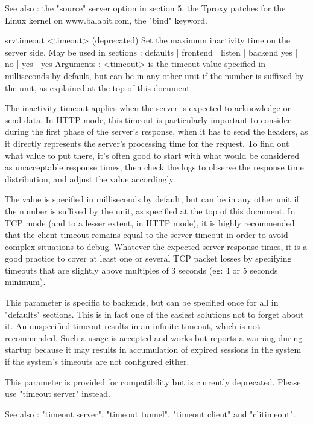   See also : the "source" server option in section 5, the Tproxy patches for
             the Linux kernel on www.balabit.com, the "bind" keyword.


srvtimeout <timeout> (deprecated)
  Set the maximum inactivity time on the server side.
  May be used in sections :   defaults | frontend | listen | backend
                                 yes   |    no    |   yes  |   yes
  Arguments :
    <timeout> is the timeout value specified in milliseconds by default, but
              can be in any other unit if the number is suffixed by the unit,
              as explained at the top of this document.

  The inactivity timeout applies when the server is expected to acknowledge or
  send data. In HTTP mode, this timeout is particularly important to consider
  during the first phase of the server's response, when it has to send the
  headers, as it directly represents the server's processing time for the
  request. To find out what value to put there, it's often good to start with
  what would be considered as unacceptable response times, then check the logs
  to observe the response time distribution, and adjust the value accordingly.

  The value is specified in milliseconds by default, but can be in any other
  unit if the number is suffixed by the unit, as specified at the top of this
  document. In TCP mode (and to a lesser extent, in HTTP mode), it is highly
  recommended that the client timeout remains equal to the server timeout in
  order to avoid complex situations to debug. Whatever the expected server
  response times, it is a good practice to cover at least one or several TCP
  packet losses by specifying timeouts that are slightly above multiples of 3
  seconds (eg: 4 or 5 seconds minimum).

  This parameter is specific to backends, but can be specified once for all in
  "defaults" sections. This is in fact one of the easiest solutions not to
  forget about it. An unspecified timeout results in an infinite timeout, which
  is not recommended. Such a usage is accepted and works but reports a warning
  during startup because it may results in accumulation of expired sessions in
  the system if the system's timeouts are not configured either.

  This parameter is provided for compatibility but is currently deprecated.
  Please use "timeout server" instead.

  See also : "timeout server", "timeout tunnel", "timeout client" and
             "clitimeout".



